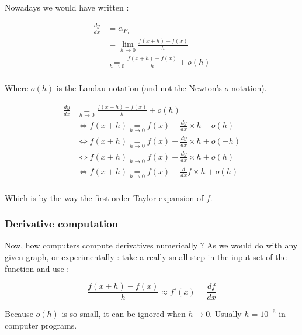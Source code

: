 \documentclass[12pt]{article}
\newcommand\underrel[2]{\mathrel{\mathop{#2}\limits_{#1}}}
\begin{document}
Nowadays we would have written :

\begin{equation*}
    \begin{split}
        \frac{dy}{dx} &= \alpha_{P_1} \\
                    &= \lim_{ h \to 0} \frac{f(x + h) - f(x)}{h} \\
                    & \underrel{h \to 0}{=} \frac{f(x + h) - f(x)}{h} + o(h)  \\
    \end{split}
\end{equation*}

Where $o(h)$ is the Landau notation \cite{wiki_big_O_notation} (and not the Newton's $o$ notation).


\begin{equation*}
    \begin{split}
        \frac{dy}{dx} & \underrel{h \to 0}{=} \frac{f(x + h) - f(x)}{h} + o(h)  \\
                    &\Leftrightarrow f(x + h) \underrel{h \to 0}{=}  f(x) + \frac{dy}{dx} \times h - o(h) \\
                    &\Leftrightarrow  f(x + h) \underrel{h \to 0}{=} f(x) + \frac{dy}{dx} \times h + o(-h) \\
                    &\Leftrightarrow  f(x + h) \underrel{h \to 0}{=} f(x) + \frac{dy}{dx} \times h + o(h) \\
                    &\Leftrightarrow  f(x + h) \underrel{h \to 0}{=} f(x) + \frac{d}{dx}f \times h + o(h) \\
    \end{split}
\end{equation*}

Which is by the way the first order Taylor expansion of $f$.


\subsubsection{Derivative computation}


Now, how computers compute derivatives numerically ? As we would do with any given graph, or experimentally : take a really small step in the input set of the function and use :

$$
\frac{f(x+h) - f(x)}{h} \approx f'(x) = \frac{df}{dx}
$$

Because $o(h)$ is so small, it can be ignored when $h \rightarrow 0$. Usually $h=10^{-6}$ in computer programs.
\end{document}
